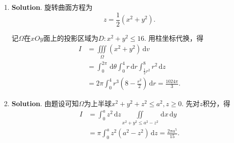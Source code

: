 \documentclass[../main.tex]{subfiles}
\begin{document}
\begin{enumerate}
    \item \textbf{Solution}. 旋转曲面方程为
          \[
              z=\frac{1}{2}(x^{2}+y^{2}).
          \]

          记$\Omega$在$xOy$面上的投影区域为$D:x^{2}+y^{2}\leq16$. 用柱坐标代换，得
          \[
              \begin{aligned}
                  I & =\iiint\limits_{\Omega}(x^{2}+y^{2})\,\mathrm{d}v                                                          \\
                    & =\int_{0}^{2\pi}\,\mathrm{d}\theta\int_{0}^{4}r\,\mathrm{d}r \int_{\frac{1}{2}r^{2}}^{8}r^{2}\,\mathrm{d}z \\
                    & =2\pi\int_{0}^{4}r^{3}\left(8-\frac{r^{2}}{2}\right)\,\mathrm{d}r =\frac{1024\pi}{3}.
              \end{aligned}
          \]

    \item \textbf{Solution}. 由题设可知$\Omega$为上半球$x^{2}+y^{2}+z^{2}\leq a^{2}
              ,z\geq0$. 先对$z$积分，得
          \[
              \begin{aligned}
                  I & =\int_{0}^{a}z^{2}\,\mathrm{d}z \iint\limits_{x^{2}+y^{2}\leq a^{2}-z^{2}}\,\mathrm{d}x\,\mathrm{d}y \\
                    & =\pi\int_{0}^{a}z^{2}(a^{2}-z^{2})\,\mathrm{d}z =\frac{2\pi a^{5}}{15}.
              \end{aligned}
          \]
\end{enumerate}
\end{document}
